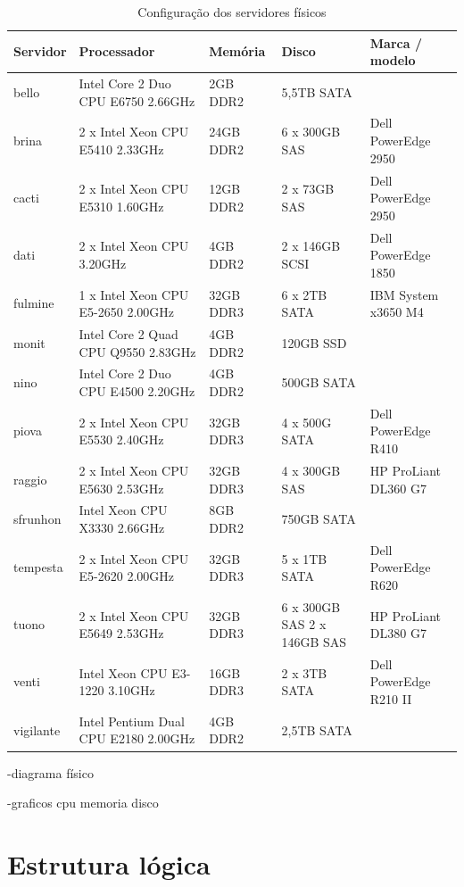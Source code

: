\begin{table}
\caption {Configuração dos servidores físicos}
\label{tab:servfisicos}
\begin{center}
\begin{tabular}{|l|p{3.8cm}|l|p{3cm}|l|}\hline
Servidor & Processador & Memória & Disco & Marca / modelo\\\hline
bello & Intel Core 2 Duo CPU E6750 2.66GHz & 2GB DDR2 & 5,5TB SATA & \\\hline
brina & 2 x Intel Xeon CPU E5410 2.33GHz & 24GB DDR2 & 6 x 300GB SAS & Dell PowerEdge 2950\\\hline
cacti & 2 x Intel Xeon CPU E5310 1.60GHz & 12GB DDR2 & 2 x 73GB SAS & Dell PowerEdge 2950\\\hline
dati & 2 x Intel Xeon CPU 3.20GHz & 4GB DDR2 & 2 x 146GB SCSI & Dell PowerEdge 1850\\\hline
fulmine & 1 x Intel Xeon CPU E5-2650 2.00GHz & 32GB DDR3 & 6 x 2TB SATA & IBM System x3650 M4\\\hline
monit & Intel Core 2 Quad CPU Q9550 2.83GHz & 4GB DDR2 & 120GB SSD & \\\hline
nino & Intel Core 2 Duo CPU E4500 2.20GHz & 4GB DDR2 & 500GB SATA & \\\hline
piova & 2 x Intel Xeon CPU E5530 2.40GHz & 32GB DDR3 & 4 x 500G SATA & Dell PowerEdge R410\\\hline
raggio & 2 x  Intel Xeon CPU E5630 2.53GHz & 32GB DDR3 & 4 x 300GB SAS & HP ProLiant DL360 G7\\\hline
sfrunhon & Intel Xeon CPU X3330 2.66GHz & 8GB DDR2 & 750GB SATA & \\\hline
tempesta & 2 x Intel Xeon CPU E5-2620 2.00GHz & 32GB DDR3 & 5 x 1TB SATA & Dell PowerEdge R620\\\hline
tuono & 2 x Intel Xeon CPU E5649 2.53GHz & 32GB DDR3 & 6 x 300GB SAS 2 x 146GB SAS & HP ProLiant DL380 G7\\\hline
venti & Intel Xeon CPU E3-1220 3.10GHz & 16GB DDR3 & 2 x 3TB SATA & Dell PowerEdge R210 II\\\hline
vigilante & Intel Pentium Dual CPU E2180 2.00GHz & 4GB DDR2 & 2,5TB SATA & \\\hline
\end{tabular}
\end{center}
\end{table}

-diagrama físico

-graficos cpu memoria disco

\section{Estrutura lógica}
\label{section:estlog}

